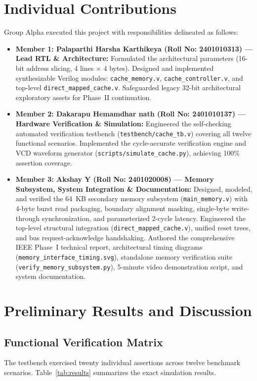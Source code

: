 \documentclass[conference]{IEEEtran}
\begin{document}
\section{Individual Contributions}
Group Alpha executed this project with responsibilities delineated as follows:

\begin{itemize}
    \item \textbf{Member 1: Palaparthi Harsha Karthikeya (Roll No: 2401010313) --- Lead RTL \& Architecture:}
    Formulated the architectural parameters (16-bit address slicing, 4 lines $\times$ 4 bytes). Designed and implemented synthesizable Verilog modules: \texttt{cache\_memory.v}, \texttt{cache\_controller.v}, and top-level \texttt{direct\_mapped\_cache.v}. Safeguarded legacy 32-bit architectural exploratory assets for Phase~II continuation.
    \item \textbf{Member 2: Dakarapu Hemamdhar nath (Roll No: 2401010137) --- Hardware Verification \& Simulation:}
    Engineered the self-checking automated verification testbench (\texttt{testbench/cache\_tb.v}) covering all twelve functional scenarios. Implemented the cycle-accurate verification engine and VCD waveform generator (\texttt{scripts/simulate\_cache.py}), achieving 100\% assertion coverage.
    \item \textbf{Member 3: Akshay Y (Roll No: 2401020008) --- Memory Subsystem, System Integration \& Documentation:}
    Designed, modeled, and verified the 64~KB secondary memory subsystem (\texttt{main\_memory.v}) with 4-byte burst read packaging, boundary alignment masking, single-byte write-through synchronization, and parameterized 2-cycle latency. Engineered the top-level structural integration (\texttt{direct\_mapped\_cache.v}), unified reset trees, and bus request-acknowledge handshaking. Authored the comprehensive IEEE Phase~I technical report, architectural timing diagrams (\texttt{memory\_interface\_timing.svg}), standalone memory verification suite (\texttt{verify\_memory\_subsystem.py}), 5-minute video demonstration script, and system documentation.
\end{itemize}

\section{Preliminary Results and Discussion}

\subsection{Functional Verification Matrix}
The testbench exercised twenty individual assertions across twelve benchmark scenarios. Table~\ref{tab:results} summarizes the exact simulation results.
\end{document}
